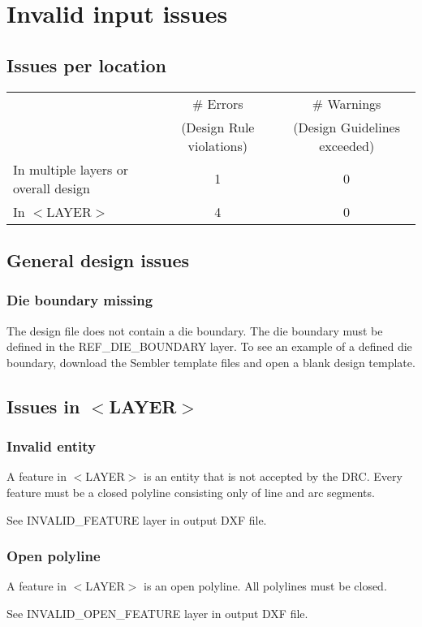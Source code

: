 \documentclass[twoside]{article}
\begin{document}
\section{Invalid input issues}
\subsection{Issues per location}
\begin{tabular}{l|c|c}
 & \# Errors & \# Warnings \\
 & (Design Rule violations)& (Design Guidelines exceeded) \\ \hline
In multiple layers or overall design& 1& 0\\
In  $<$LAYER$>$& 4& 0\\
\end{tabular}

\subsection{General design issues}
\subsubsection{Die boundary missing}
The design file does not contain a die boundary. The die boundary must be defined in the REF\_DIE\_BOUNDARY layer. To see an example of a defined die boundary, download the Sembler template files and open a blank design template.

\subsection{Issues in $<$LAYER$>$}
\subsubsection{Invalid entity}
\par A feature in $<$LAYER$>$ is an entity that is not accepted by the DRC. Every feature must be a closed polyline consisting only of line and arc segments.
\par See INVALID\_FEATURE layer in output DXF file.
\subsubsection{Open polyline}
\par A feature in $<$LAYER$>$ is an open polyline. All polylines must be closed.
\par See INVALID\_OPEN\_FEATURE layer in output DXF file.
\end{document}
